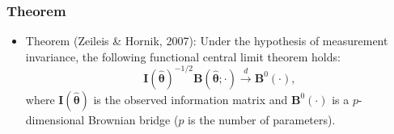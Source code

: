 \documentclass{beamer}
\begin{document}

\begin{frame}[fragile]
  \frametitle{Theorem}
  \begin{itemize}
    \item Theorem (Zeileis \& Hornik, 2007): Under the hypothesis of
      measurement invariance, the following functional central limit
      theorem holds:
  \begin{equation*}
  {\bm{I}}(\widehat{{\bm{\theta}}})^{-1/2}{\bm{B}}(\widehat{{\bm{\theta}}}; \cdot) 
\overset{d}{\rightarrow} {\bm B}^{0}(\cdot),
  \end{equation*}
 where ${\bm{I}}(\widehat{{\bm{\theta}}})$ is the observed
 information matrix and ${\bm B}^{0}(\cdot)$ is a
 $p$-dimensional Brownian bridge ($p$ is the number of parameters).
  \end{itemize}
\end{frame}


\end{document}
